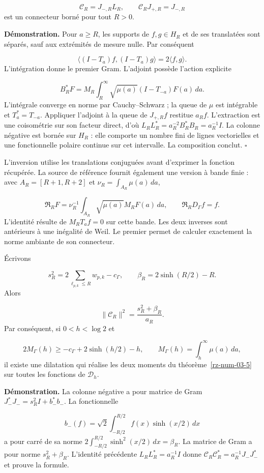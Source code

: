 \[
\mathcal C_R=J_{-,R}L_R,\qquad
\mathcal C_RJ_{+,R}=J_{-,R}
\]
est un connecteur borné pour tout \(R>0\).

\textbf{Démonstration.} Pour \(a\geq R\), les supports de \(f,g\in H_R\) et de ses translatées sont séparés, sauf aux extrémités de mesure nulle. Par conséquent

\[
\langle(I-T_a)f,(I-T_a)g\rangle=2\langle f,g\rangle.
\]
L’intégration donne le premier Gram. L’adjoint possède l’action explicite

\[
B_R^*F=M_R\int_R^\infty\sqrt{\mu(a)}(I-T_{-a})F(a)\,da.
\]
L’intégrale converge en norme par Cauchy–Schwarz ; la queue de \(\mu\) est intégrable et \(T_a^*=T_{-a}\). Appliquer l’adjoint à la queue de \(J_{+,R}f\) restitue \(a_Rf\). L’extraction est une coisométrie sur son facteur direct, d’où \(L_RL_R^*=a_R^{-2}B_R^*B_R=a_R^{-1}I\). La colonne négative est bornée sur \(H_R\) : elle comporte un nombre fini de lignes vectorielles et une fonctionnelle polaire continue sur cet intervalle. La composition conclut. \hfill\(\square\)

L'inversion utilise les translations conjuguées avant d'exprimer la fonction récupérée. La source de référence fournit également une version à bande finie : avec \(A_R=[R+1,R+2]\) et \(\nu_R=\int_{A_R}\mu(a)\,da\),

\[
\mathfrak R_RF=\nu_R^{-1}\int_{A_R}
\sqrt{\mu(a)}M_RF(a)\,da,\qquad
\mathfrak R_RD_\Gamma f=f.
\]
L’identité résulte de \(M_RT_af=0\) sur cette bande. Les deux inverses sont antérieurs à une inégalité de Weil. Le premier permet de calculer exactement la norme ambiante de son connecteur.

Écrivons

\[
s_R^2=2\sum_{\ell_{p,k}\leq R}w_{p,k}-c_\Gamma,\qquad
\beta_R=2\sinh(R/2)-R.
\]
Alors

\[
\|\mathcal C_R\|^2=\frac{s_R^2+\beta_R}{a_R}.
\]
Par conséquent, si \(0<h<\log2\) et

\[
2M_\Gamma(h)\geq-c_\Gamma+2\sinh(h/2)-h,\qquad
M_\Gamma(h)=\int_h^\infty\mu(a)\,da,
\]
il existe une dilatation qui réalise les deux moments du théorème~\ref{rz-num-03-5} sur toutes les fonctions de \(\mathcal D_h\).

\textbf{Démonstration.} La colonne négative a pour matrice de Gram \(J_-^*J_-=s_R^2I+b_-^*b_-\). La fonctionnelle

\[
b_-(f)=\sqrt2\int_{-R/2}^{R/2}f(x)\sinh(x/2)\,dx
\]
a pour carré de sa norme \(2\int_{-R/2}^{R/2}\sinh^2(x/2)\,dx=\beta_R\). La matrice de Gram a pour norme \(s_R^2+\beta_R\). L'identité précédente \(L_RL_R^*=a_R^{-1}I\) donne \(\mathcal C_R\mathcal C_R^*=a_R^{-1}J_-J_-^*\) et prouve la formule.

